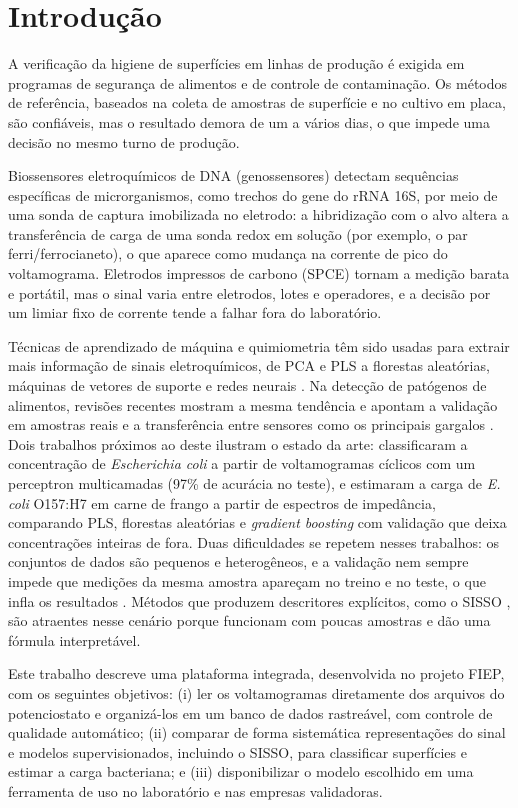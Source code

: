 \section{Introdução}

A verificação da higiene de superfícies em linhas de produção é exigida em programas de segurança
de alimentos e de controle de contaminação. Os métodos de referência, baseados na coleta de
amostras de superfície \citep{iso18593} e no cultivo em placa, são confiáveis, mas o resultado
demora de um a vários dias, o que impede uma decisão no mesmo turno de produção.

Biossensores eletroquímicos de DNA (genossensores) detectam sequências específicas de
microrganismos, como trechos do gene do rRNA 16S, por meio de uma sonda de captura imobilizada no
eletrodo: a hibridização com o alvo altera a transferência de carga de uma sonda redox em solução
(por exemplo, o par ferri/ferrocianeto), o que aparece como mudança na corrente de pico do
voltamograma. Eletrodos impressos de carbono (SPCE) tornam a medição barata e portátil, mas o
sinal varia entre eletrodos, lotes e operadores, e a decisão por um limiar fixo de corrente tende a
falhar fora do laboratório.

Técnicas de aprendizado de máquina e quimiometria têm sido usadas para extrair mais informação de
sinais eletroquímicos, de PCA e PLS a florestas aleatórias, máquinas de vetores de suporte e redes
neurais \citep{puthongkham2021, bocan2025}. Na detecção de patógenos de alimentos, revisões recentes
mostram a mesma tendência e apontam a validação em amostras reais e a transferência entre sensores
como os principais gargalos \citep{banicod2025}. Dois trabalhos próximos ao deste ilustram o
estado da arte: \citet{aliev2024} classificaram a concentração de \textit{Escherichia coli} a partir
de voltamogramas cíclicos com um perceptron multicamadas (97\% de acurácia no teste), e
\citet{tian2026} estimaram a carga de \textit{E. coli} O157:H7 em carne de frango a partir de
espectros de impedância, comparando PLS, florestas aleatórias e \textit{gradient boosting} com
validação que deixa concentrações inteiras de fora. Duas dificuldades se repetem nesses trabalhos: os
conjuntos de dados são pequenos e heterogêneos, e a validação nem sempre impede que medições da
mesma amostra apareçam no treino e no teste, o que infla os resultados \citep{kapoor2023}. Métodos
que produzem descritores explícitos, como o SISSO \citep{ouyang2018}, são atraentes nesse cenário
porque funcionam com poucas amostras e dão uma fórmula interpretável.

Este trabalho descreve uma plataforma integrada, desenvolvida no projeto FIEP, com os seguintes
objetivos: (i) ler os voltamogramas diretamente dos arquivos do potenciostato e organizá-los em um
banco de dados rastreável, com controle de qualidade automático; (ii) comparar de forma sistemática
representações do sinal e modelos supervisionados, incluindo o SISSO, para classificar superfícies
e estimar a carga bacteriana; e (iii) disponibilizar o modelo escolhido em uma ferramenta de uso no
laboratório e nas empresas validadoras.
